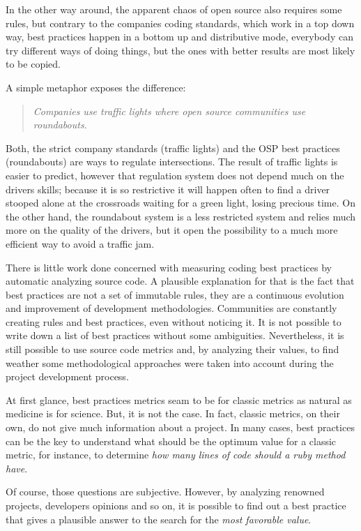 In the other way around, the apparent chaos of open source also requires some rules,
but contrary to the companies coding standards, which work in a top down way,
best practices happen in a bottom up and distributive mode,
everybody can try different ways of doing things,
but the ones with better results are most likely to be copied.

A simple metaphor exposes the difference:
\begin{quote}\emph{
  Companies use traffic lights where open source communities use roundabouts.
}\end{quote}

Both, the strict company standards (traffic lights) and the OSP best practices (roundabouts) are ways to regulate intersections.
The result of traffic lights is  easier to predict, however that regulation  system does not depend much on the drivers skills;
because it is so restrictive it will happen often to find a driver stooped alone
at the crossroads waiting for a green light, losing precious time.
On the other hand, the roundabout system is a less restricted system and relies much more on the quality of the drivers,
but it open the possibility to a much more efficient way to avoid a traffic jam.

There is little work done concerned with measuring coding best practices by automatic analyzing source code.
A plausible explanation for that is the fact that best practices are not a set of immutable rules,
they are a continuous evolution and improvement of development methodologies.
Communities are constantly creating rules and best practices, even without noticing it.
It is not possible to write down a list of best practices without some ambiguities.
Nevertheless, it is still possible to use source code metrics and, by analyzing their values,
to find weather some methodological approaches were taken into account during the project development process.

At first glance, best practices metrics seam to be for classic metrics as natural as medicine is for science.
But, it is not the case.
In fact, classic metrics, on their own, do not give much information about a project.
In many cases, best practices can be the key to understand what should be the optimum value for a classic metric,
for instance, to determine \emph{how many lines of code should a ruby method have}.

Of course, those questions are subjective.
However, by analyzing renowned projects, developers opinions and so on, it is possible to find out a best practice
that gives a plausible answer to the search for the \emph{most favorable value}.

